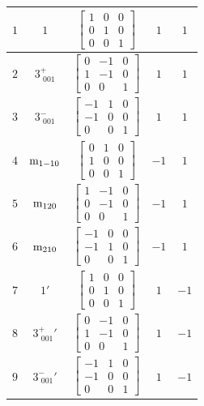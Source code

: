 \documentclass[fleqn,8pt]{jsarticle}
\begin{document}
\begin{longtable}{ccccc}
$ 1 $ & $ 1 $ & $ \begin{bmatrix} 1 & 0 & 0 \\ 0 & 1 & 0 \\ 0 & 0 & 1 \end{bmatrix} $ & $ 1 $ & $ 1 $ \\ \hline
$ 2 $ & $ 3^{+}_{\,\,001} $ & $ \begin{bmatrix} 0 & -1 & 0 \\ 1 & -1 & 0 \\ 0 & 0 & 1 \end{bmatrix} $ & $ 1 $ & $ 1 $ \\ \hline
$ 3 $ & $ 3^{-}_{\,\,001} $ & $ \begin{bmatrix} -1 & 1 & 0 \\ -1 & 0 & 0 \\ 0 & 0 & 1 \end{bmatrix} $ & $ 1 $ & $ 1 $ \\ \hline
$ 4 $ & $ {\rm m}_{1-10} $ & $ \begin{bmatrix} 0 & 1 & 0 \\ 1 & 0 & 0 \\ 0 & 0 & 1 \end{bmatrix} $ & $ -1 $ & $ 1 $ \\ \hline
$ 5 $ & $ {\rm m}_{120} $ & $ \begin{bmatrix} 1 & -1 & 0 \\ 0 & -1 & 0 \\ 0 & 0 & 1 \end{bmatrix} $ & $ -1 $ & $ 1 $ \\ \hline
$ 6 $ & $ {\rm m}_{210} $ & $ \begin{bmatrix} -1 & 0 & 0 \\ -1 & 1 & 0 \\ 0 & 0 & 1 \end{bmatrix} $ & $ -1 $ & $ 1 $ \\ \hline
$ 7 $ & $ 1{}' $ & $ \begin{bmatrix} 1 & 0 & 0 \\ 0 & 1 & 0 \\ 0 & 0 & 1 \end{bmatrix} $ & $ 1 $ & $ -1 $ \\ \hline
$ 8 $ & $ 3^{+}_{\,\,001}{}' $ & $ \begin{bmatrix} 0 & -1 & 0 \\ 1 & -1 & 0 \\ 0 & 0 & 1 \end{bmatrix} $ & $ 1 $ & $ -1 $ \\ \hline
$ 9 $ & $ 3^{-}_{\,\,001}{}' $ & $ \begin{bmatrix} -1 & 1 & 0 \\ -1 & 0 & 0 \\ 0 & 0 & 1 \end{bmatrix} $ & $ 1 $ & $ -1 $ \\ \hline

\end{longtable}
\end{document}
